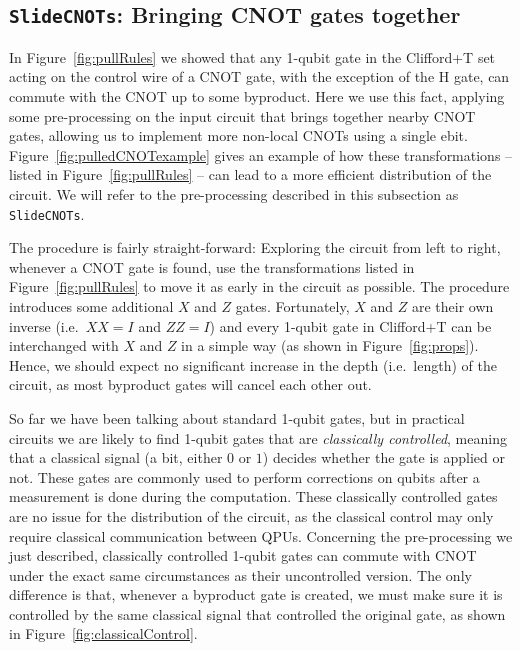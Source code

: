 \subsection{\texttt{SlideCNOTs}: Bringing CNOT gates together}
\label{pullCNOTs}



In Figure~\ref{fig:pullRules} we showed that any 1-qubit gate in the Clifford+T set acting on the control wire of a CNOT gate, with the exception of the H gate, can commute with the CNOT up to some byproduct. Here we use this fact, applying some pre-processing on the input circuit that brings together nearby CNOT gates, allowing us to implement more non-local CNOTs using a single ebit. Figure~\ref{fig:pulledCNOTexample} gives an example of how these transformations -- listed in Figure~\ref{fig:pullRules} -- can lead to a more efficient distribution of the circuit. We will refer to the pre-processing described in this subsection as \texttt{SlideCNOTs}.



The procedure is fairly straight-forward: Exploring the circuit from left to right, whenever a CNOT gate is found, use the transformations listed in Figure~\ref{fig:pullRules} to move it as early in the circuit as possible. The procedure introduces some additional \(X\) and \(Z\) gates. Fortunately, \(X\) and \(Z\) are their own inverse (i.e.\ \(XX = I\) and \(ZZ = I\)) and every 1-qubit gate in Clifford+T can be interchanged with \(X\) and \(Z\) in a simple way (as shown in Figure~\ref{fig:props}). Hence, we should expect no significant increase in the depth (i.e.\ length) of the circuit, as most byproduct gates will cancel each other out.

So far we have been talking about standard 1-qubit gates, but in practical circuits we are likely to find 1-qubit gates that are \textit{classically controlled}, meaning that a classical signal (a bit, either \(0\) or \(1\)) decides whether the gate is applied or not. These gates are commonly used to perform corrections on qubits after a measurement is done during the computation. These classically controlled gates are no issue for the distribution of the circuit, as the classical control may only require classical communication between QPUs. Concerning the pre-processing we just described, classically controlled 1-qubit gates can commute with CNOT under the exact same circumstances as their uncontrolled version. The only difference is that, whenever a byproduct gate is created, we must make sure it is controlled by the same classical signal that controlled the original gate, as shown in Figure~\ref{fig:classicalControl}.

